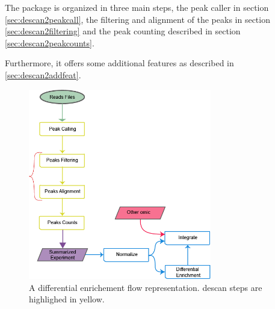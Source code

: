 The package is organized in three main steps, the peak caller in section \ref{sec:descan2peakcall}, the filtering and alignment of the peaks in section \ref{sec:descan2filtering} and the peak counting described in section \ref{sec:descan2peakcounts}.

Furthermore, it offers some additional features as described in \ref{sec:descan2addfeat}.


\begin{figure}[H]
\centering
\includegraphics[width=8cm, keepaspectratio]{img/descan2/flow.png}
\caption[DEScan2 workflow]{A differential enrichement flow representation. \gls{descan} steps are highlighed in yellow.}
\label{fig:descan2flow}
\end{figure}
